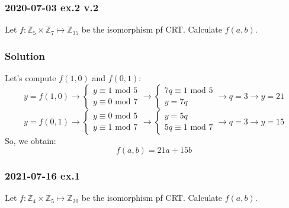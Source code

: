 \documentclass[11pt, a4paper]{article}
\newcommand{\mymod}{
    \text{ mod }
}
\begin{document}
\subsubsection{2020-07-03 ex.2 v.2}
Let $f:\mathbb{Z}_5\times\mathbb{Z}_7\mapsto\mathbb{Z}_{35}$ be the isomorphism pf CRT. Calculate $f(a,b)$.
\subsubsection*{Solution}
Let's compute $f(1,0)$ and $f(0,1)$:
\begin{equation*}
    y=f(1,0)\longrightarrow
    \begin{cases}
        y\equiv1\mymod5\\
        y\equiv0\mymod7
    \end{cases}
    \longrightarrow
    \begin{cases}
        7q\equiv1\mymod5\\
        y=7q
    \end{cases}
    \longrightarrow q=3\longrightarrow y=21
\end{equation*}
\begin{equation*}
    y=f(0,1)\longrightarrow
    \begin{cases}
        y\equiv0\mymod5\\
        y\equiv1\mymod7
    \end{cases}
    \longrightarrow
    \begin{cases}
        y=5q\\
        5q\equiv1\mymod7
    \end{cases}
    \longrightarrow q=3\longrightarrow y=15
\end{equation*}
So, we obtain:
$$f(a,b)=21a+15b$$

\subsubsection{2021-07-16 ex.1}
Let $f:\mathbb{Z}_4\times\mathbb{Z}_5\mapsto\mathbb{Z}_{20}$ be the isomorphism pf CRT. Calculate $f(a,b)$.
\end{document}

